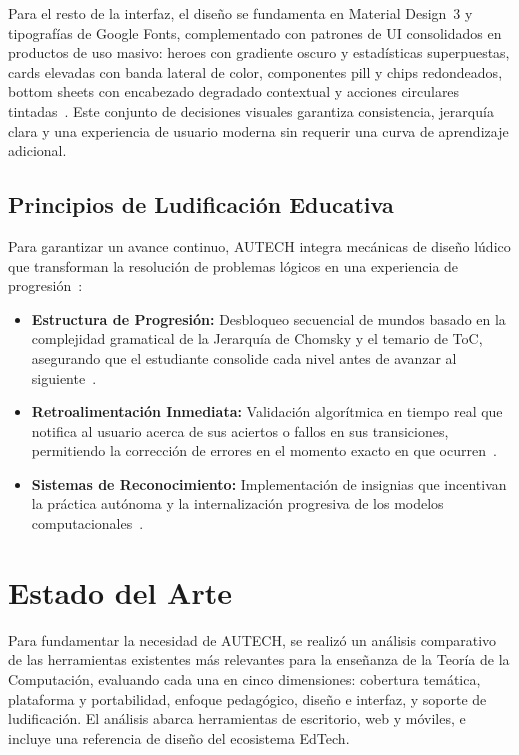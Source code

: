 Para el resto de la interfaz, el diseño se fundamenta en Material Design~3 y tipografías de
Google Fonts, complementado con patrones de UI consolidados en productos de uso masivo:
heroes con gradiente oscuro y estadísticas superpuestas, cards elevadas con banda lateral de
color, componentes pill y chips redondeados, bottom sheets con encabezado degradado contextual
y acciones circulares tintadas~\cite{materialdesign2023}. Este conjunto de decisiones visuales
garantiza consistencia, jerarquía clara y una experiencia de usuario moderna sin requerir una
curva de aprendizaje adicional.

\subsection{Principios de Ludificación Educativa}
\label{ssec:ludificacion_educativa}

Para garantizar un avance continuo, AUTECH integra mecánicas de diseño lúdico que transforman
la resolución de problemas lógicos en una experiencia de progresión~\cite{deterding2011}:

\begin{itemize}
    \item \textbf{Estructura de Progresión:} Desbloqueo secuencial de mundos basado en la
        complejidad gramatical de la Jerarquía de Chomsky y el temario de ToC, asegurando que
        el estudiante consolide cada nivel antes de avanzar al siguiente~\cite{hopcroft2007}.

    \item \textbf{Retroalimentación Inmediata:} Validación algorítmica en tiempo real que
        notifica al usuario acerca de sus aciertos o fallos en sus transiciones, permitiendo
        la corrección de errores en el momento exacto en que ocurren~\cite{deterding2011}.

    \item \textbf{Sistemas de Reconocimiento:} Implementación de insignias que incentivan la
        práctica autónoma y la internalización progresiva de los modelos
        computacionales~\cite{materialdesign2023}.
\end{itemize}

\section{Estado del Arte}
\label{sec:estado_arte}

Para fundamentar la necesidad de AUTECH, se realizó un análisis comparativo de las herramientas
existentes más relevantes para la enseñanza de la Teoría de la Computación, evaluando cada una
en cinco dimensiones: cobertura temática, plataforma y portabilidad, enfoque pedagógico, diseño
e interfaz, y soporte de ludificación. El análisis abarca herramientas de escritorio, web y
móviles, e incluye una referencia de diseño del ecosistema EdTech.

